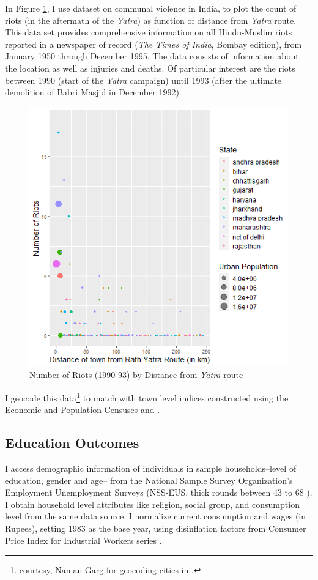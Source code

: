 \documentclass{article}
\begin{document}
In Figure \ref{fig:riots_yatra}, I use \cite{vw.2006} dataset on communal violence in India, to plot the count of riots (in the aftermath of the \textit{Yatra}) as function of distance from \textit{Yatra} route. This data set provides comprehensive information on all Hindu-Muslim riots reported in a newspaper of record (\textit{The Times of India}, Bombay edition), from January 1950 through December 1995. The data consists of information about the location as well as injuries and deaths. Of particular interest are the riots between 1990 (start of the \emph{Yatra} campaign) until 1993 (after the ultimate demolition of Babri Masjid in December 1992).

\begin{figure}[H]
    \centering
    \includegraphics[scale = 0.6]{images/graph_riots_yatra.png}
    \caption{Number of Riots (1990-93) by Distance from \textit{Yatra} route}
    \label{fig:riots_yatra}
\end{figure}

I geocode this data\footnote{courtesy, Naman Garg for geocoding cities in \cite{vw.2006}.} to match with town level indices constructed using the Economic and Population Censuses and \cite{sedac}. 

\subsection{Education Outcomes}
I access demographic information of individuals in sample households--level of education, gender and age-- from the National Sample Survey Organization's Employment Unemployment Surveys (NSS-EUS, thick rounds between 43 \citep{eus.1988} to 68 \citep{eus.2012}). I obtain household level attributes like religion, social group, and consumption level from the same data source. I normalize current consumption and wages (in Rupees), setting 1983 as the base year, using disinflation factors from Consumer Price Index for Industrial Workers series \citep{cpi_iw}.
\end{document}
